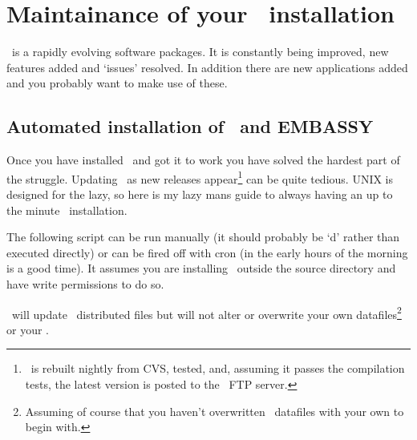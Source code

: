 \documentclass{report}
\begin{document}
\section{Maintainance of your \EMBOSS\ installation}

\EMBOSS\ is a rapidly evolving software packages. It is constantly being improved, new features added and `issues' resolved. In addition there are new applications added and you probably want to make use of these.

\subsection{Automated installation of \EMBOSS\ and EMBASSY}

Once you have installed \EMBOSS\ and got it to work you have solved the hardest part of the struggle. Updating \EMBOSS\ as new releases appear\footnote{\EMBOSS\ is rebuilt nightly from CVS, tested, and, assuming it passes the compilation tests, the latest version is posted to the \EMBOSS\ FTP server. } can be quite tedious. UNIX is designed for the lazy, so here is my lazy mans guide to always having an up to the minute \EMBOSS\ installation.

The following script can be run manually (it should probably be `d' rather than executed directly) or can be fired off with cron (in the early hours of the morning is a good time). It assumes you are installing \EMBOSS\ outside the source directory and have write permissions to do so.

\EMBOSS\ will update \EMBOSS\ distributed files but will not alter or overwrite your own datafiles\footnote{Assuming of course that you haven't overwritten \EMBOSS\ datafiles with your own to begin with.} or your .
\end{document}
